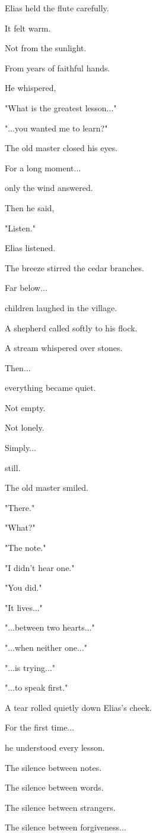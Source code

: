 \documentclass[12pt,openany]{book}
\begin{document}
Elias held the flute carefully.

It felt warm.

Not from the sunlight.

From years of faithful hands.

He whispered,

"What is the greatest lesson..."

"...you wanted me to learn?"

The old master closed his eyes.

For a long moment...

only the wind answered.

Then he said,

"Listen."

Elias listened.

The breeze stirred the cedar branches.

Far below...

children laughed in the village.

A shepherd called softly to his flock.

A stream whispered over stones.

Then...

everything became quiet.

Not empty.

Not lonely.

Simply...

still.

The old master smiled.

"There."

"What?"

"The note."

"I didn't hear one."

"You did."

"It lives..."

"...between two hearts..."

"...when neither one..."

"...is trying..."

"...to speak first."

A tear rolled quietly down Elias's cheek.

For the first time...

he understood every lesson.

The silence between notes.

The silence between words.

The silence between strangers.

The silence between forgiveness...
\end{document}
